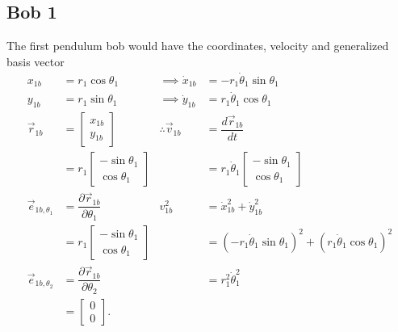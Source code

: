\documentclass[12pt,a4paper,portrait]{article}
\begin{document}
	\subsection{Bob 1}
	The first pendulum bob would have the coordinates, velocity and generalized basis vector
	\begin{align*}
		x_{1b} &= r_1 \cos{\theta_1} &\implies \dot{x}_{1b} &= -r_1\dot{\theta}_1 \sin{\theta_1}\\
		y_{1b} &= r_1 \sin{\theta_1} &\implies \dot{y}_{1b} &= r_1 \dot{\theta}_1 \cos{\theta_1} \\
		\vec{r}_{1b} &= \begin{bmatrix}
			x_{1b}\\
			y_{1b}
		\end{bmatrix}  &\therefore \vec{v}_{1b} &= \dfrac{d \vec{r}_{1b}}{dt}\\
		&= r_1\begin{bmatrix}
				-\sin{\theta_1} \\
				\cos{\theta_1}
			\end{bmatrix} & &=r_1\dot{\theta}_1 \begin{bmatrix}
			-\sin{\theta_1} \\
			\cos{\theta_1}
		\end{bmatrix} \\
		\vec{e}_{1b,\theta_1} &= \dfrac{\partial \vec{r}_{1b}}{\partial \theta_1}& v_{1b}^2 &= \dot{x}_{1b}^2 + \dot{y}_{1b}^2 \\
		&= r_1 \begin{bmatrix}
			-\sin{\theta_1}\\
			\cos{\theta_1}
		\end{bmatrix} & &= \left(-r_1\dot{\theta}_1 \sin{\theta_1}\right)^2 + \left(r_1 \dot{\theta}_1 \cos{\theta_1}\right)^2 \\
		\vec{e}_{1b,\theta_2} &= \dfrac{\partial \vec{r}_{1b}}{\partial \theta_2} &&= r_1^2 \dot{\theta}_1^2\\
		&= \begin{bmatrix}
			0\\
			0
		\end{bmatrix}.
	\end{align*}
	
\end{document}
